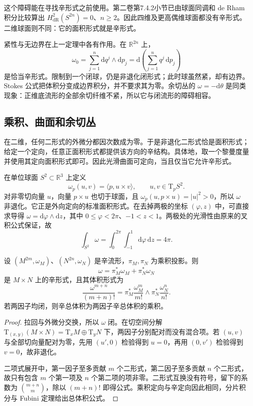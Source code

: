这个障碍能在寻找辛形式之前使用。第二卷第7.4.2小节已由球面同调和 de Rham 积分比较算出 \(H^2_{\mathrm{dR}}(S^{2n})=0\)、\(n\ge2\)。因此四维及更高偶维球面都没有辛形式。二维球面则不同：它的面积形式就是辛形式。

\begin{example}\label{g4:exm:0704:boundary-exact}
	紧性与无边界在上一定理中各有作用。在 \(\mathbb R^{2n}\) 上，
	\[
		\omega_0=\sum_{j=1}^n\mathrm{d}q^j\wedge\mathrm{d}p_j
		=\mathrm{d}\left(\sum_{j=1}^nq^j\,\mathrm{d}p_j\right)
	\]
	是恰当辛形式。限制到一个闭球，仍是非退化闭形式；此时球虽然紧，却有边界。Stokes 公式把体积分变成边界积分，并不要求其为零。余切丛的 \(\omega=-\mathrm{d}\theta\) 是同类现象：正维底流形的全部余切纤维不紧，所以它与闭流形的障碍相容。
\end{example}

\subsection{乘积、曲面和余切丛}
\label{g4:subsec:0704:02}

在二维，任何二形式的外微分都因次数成为零。于是非退化二形式恰是面积形式；给定一个定向，任意正面积形式都提供该方向的辛结构。具体地，取一个黎曼度量并使用其定向面积形式即可。因此光滑曲面可定向，当且仅当它允许辛形式。

\begin{example}\label{g4:exm:0704:sphere-area}
	在单位球面 \(S^2\subset\mathbb R^3\) 上定义
	\[
		\omega_p(u,v)=\langle p,u\times v\rangle,
		\qquad u,v\in\mathrm{T}_pS^2.
	\]
	对非零切向量 \(u\)，向量 \(p\times u\) 也切于球面，且 \(\omega_p(u,p\times u)=|u|^2>0\)，所以 \(\omega\) 非退化。它正是外向定向的标准面积形式。在去掉两极的坐标 \((\varphi,z)\) 中，可直接求导得 \(\omega=\mathrm{d}\varphi\wedge\mathrm{d}z\)，其中 \(0\le\varphi<2\pi\)、\(-1<z<1\)。两极处的光滑性由原来的叉积公式保证，故
	\[
		\int_{S^2}\omega=\int_0^{2\pi}\int_{-1}^1\mathrm{d}\varphi\,\mathrm{d}z=4\pi.
	\]
\end{example}

\begin{proposition}\label{g4:prop:0704:products}
	设 \((M^{2m},\omega_M)\)、\((N^{2n},\omega_N)\) 是辛流形，\(\pi_M,\pi_N\) 为乘积投影。则
	\[
		\omega=\pi_M^*\omega_M+\pi_N^*\omega_N
	\]
	是 \(M\times N\) 上的辛形式，且其体积形式为
	\[
		\frac{\omega^{m+n}}{(m+n)!}
		=\pi_M^*\frac{\omega_M^m}{m!}\wedge
		\pi_N^*\frac{\omega_N^n}{n!}.
	\]
	若两因子均闭，则辛总体积为两因子辛总体积的乘积。
\end{proposition}
\begin{proof}
	拉回与外微分交换，所以 \(\omega\) 闭。在切空间分解 \(\mathrm{T}_{(x,y)}(M\times N)=\mathrm{T}_xM\oplus\mathrm{T}_yN\) 下，两因子分别配对而没有混合项。若 \((u,v)\) 与全部切向量配对为零，先用 \((u',0)\) 检验得到 \(u=0\)，再用 \((0,v')\) 检验得到 \(v=0\)，故非退化。

	二项式展开中，第一因子至多贡献 \(m\) 个二形式，第二因子至多贡献 \(n\) 个二形式，故只有包含 \(m\) 个第一项及 \(n\) 个第二项的项非零。二形式互换没有符号，留下的系数为 \(\binom{m+n}{m}\)，除以 \((m+n)!\) 即得公式。乘积定向与辛定向因此相同，分片积分与 Fubini 定理给出总体积公式。
\end{proof}

